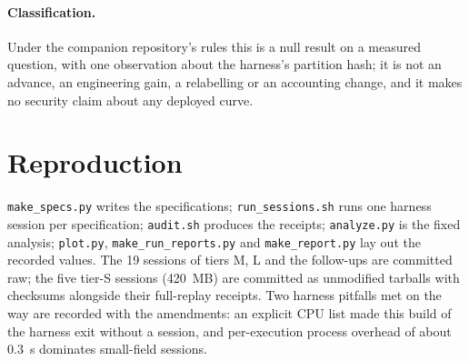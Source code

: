 \documentclass[10pt,a4paper]{article}
\newcommand{\artefact}[1]{\texttt{\small #1}}
\theoremstyle{remark}
\begin{document}
\paragraph{Classification.}
Under the companion repository's rules this is a null result on a
measured question, with one observation about the harness's partition
hash; it is not an advance, an engineering gain, a relabelling or an
accounting change, and it makes no security claim about any deployed
curve.

\section{Reproduction}

\artefact{make\_specs.py} writes the specifications; \artefact{run\_sessions.sh}
runs one harness session per specification; \artefact{audit.sh} produces
the receipts; \artefact{analyze.py} is the fixed analysis;
\artefact{plot.py}, \artefact{make\_run\_reports.py} and
\artefact{make\_report.py} lay out the recorded values. The 19 sessions of
tiers M, L and the follow-ups are committed raw; the five tier-S sessions
(420~MB) are committed as unmodified tarballs with checksums alongside
their full-replay receipts. Two harness pitfalls met on the way are
recorded with the amendments: an explicit CPU list made this build of the
harness exit without a session, and per-execution process overhead of
about $0.3$~s dominates small-field sessions.

\clearpage


\end{document}
